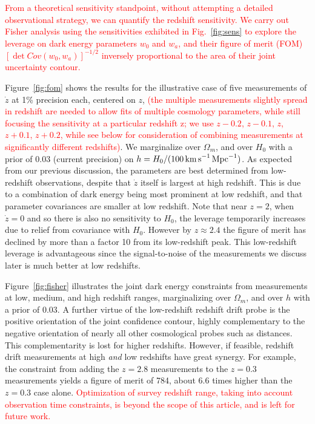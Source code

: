 \documentclass[preprint2, 10pt]{aastex}
\newcommand{\om}{\Omega_m}
\begin{document}
\textcolor{red}{From a theoretical 
sensitivity standpoint, without attempting a detailed observational 
strategy, we can quantify the redshift sensitivity. We carry out Fisher 
analysis using the sensitivities exhibited in Fig.~\ref{fig:sens} to 
explore the 
leverage on dark energy 
parameters $w_0$ and $w_a$, and their figure of merit (FOM) 
$[\det Cov(w_0,w_a)]^{-1/2}$ inversely proportional to the area of their joint 
uncertainty contour.} 

Figure~\ref{fig:fom} shows the results for the illustrative case of 
five measurements of $\dot z$ at 1\% precision each, centered on $z$, 
\textcolor{red}{(the multiple measurements slightly spread 
in redshift are needed to allow fits of multiple cosmology parameters, 
while still focusing the sensitivity at a particular redshift z; we use 
$z-0.2$, $z-0.1$, $z$, $z+0.1$, $z+0.2$, while 
see below 
for consideration of combining measurements at significantly different redshifts)}. We marginalize 
over $\om$, and over $H_0$ with a 
prior of $0.03$ (current precision) on 
$h=H_0/(100\,{\rm km\,s}^{-1}\,{\rm Mpc}^{-1})$. As expected from our previous discussion, 
the parameters are best determined from low-redshift observations, despite 
that $\dot z$ itself is largest at high redshift. This is due to a 
combination of dark energy being most prominent at low redshift, and 
that parameter covariances are smaller at low redshift. Note that near 
$z=2$, when $\dot z=0$ and so there is also no sensitivity to $H_0$, 
the leverage temporarily increases due to relief from covariance with 
$H_0$. However by $z\approx2.4$ the figure of merit has declined by more 
than a factor 10 from its low-redshift peak. This low-redshift leverage is 
advantageous since the signal-to-noise of the measurements we discuss later 
is much better at low redshifts. 

Figure~\ref{fig:fisher} illustrates the joint dark energy constraints 
from measurements at low, medium, and high redshift ranges, 
marginalizing over $\om$, and over $h$ with a prior of $0.03$. 
A further virtue 
of the low-redshift redshift drift probe is the positive orientation of 
the joint confidence contour, highly complementary to the negative orientation 
of nearly all other cosmological probes such as distances. This 
complementarity is lost for higher redshifts. However, if feasible, redshift 
drift measurements at high {\it and\/} low redshifts have great synergy. 
For example, the constraint from adding the $z=2.8$ measurements to the 
$z=0.3$ measurements yields a figure of merit of 784, about 6.6 times 
higher than the $z=0.3$ case alone. 
\textcolor{red}{Optimization of survey redshift range, 
taking into account observation time constraints, is beyond the scope of 
this article, and is left for future work.} 
\end{document}
